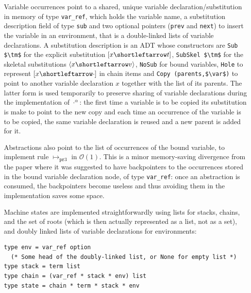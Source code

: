 \documentclass[10pt,a4paper]{article}
\theoremstyle{remark}
\newcommand{\tm}{t}
\newcommand{\var}{x}
\newcommand{\rootRew}[1]{\mapsto_{#1}}
\newcommand{\symfont}[1]{\mathtt{#1}}
\newcommand{\val}{v}
\newcommand{\esub}[2]{[#1{\shortleftarrow}#2]}
\newcommand{\skesub}[2]{\langle#1{\shortleftarrow}#2\rangle}
\newcommand{\renamenop}[1]{#1^\alpha}
\newcommand{\bigo}{{\mathcal{O}}}
\newcommand{\rtomarkblthree}{\rootRew{\prsym3}}
\newcommand{\prsym}{\symfont{pr}}
\begin{document}
Variable occurrences point to a shared, unique variable declaration/substitution in memory of type \lstinline{var_ref}, which holds the variable name, a substitution description field of type \lstinline{sub} and two optional pointers (\lstinline{prev} and \lstinline{next}) to insert the variable in an environment, that is a double-linked lists of variable declarations. A substitution description is an ADT whose constructors are \lstinline{Sub $\tm$} for the explicit substitution $\esub\var\tm$, \lstinline{SubSkel $\tm$} for the skeletal substitutions $\skesub\var\val$, \lstinline{NoSub} for bound variables, \lstinline{Hole} to represent $\esub\var\cdot$ in chain items and \lstinline{Copy (parents,$\var$)} to point to another variable declaration $\var$ together with the list of its parents. The latter form is used temporarily to preserve sharing of variable declarations during the implementation of $\renamenop\cdot$: the first time a variable is to be copied its substitution is make to point to the new copy and each time an occurrence of the variable is to be copied, the same variable declaration is reused and a new parent is added for it.

Abstractions also point to the list of occurrences of the bound variable, to implement rule $\rtomarkblthree$ in $\bigo(1)$. This is a minor memory-saving divergence from the paper where it was suggested to have backpointers to the occurrences stored in the bound variable declaration node, of type \lstinline{var_ref}: once an abstraction is consumed, the backpointers become useless and thus avoiding them in the implementation saves some space.

Machine states are implemented straightforwardly using lists for stacks, chains, and the set of roots (which is then actually represented as a list, not as a set), and doubly linked lists of variable declarations for environments:
\begin{lstlisting}
type env = var_ref option
  (* Some head of the doubly-linked list, or None for empty list *)
type stack = term list                                                                                   
type chain = (var_ref * stack * env) list
type state = chain * term * stack * env
\end{lstlisting}
\end{document}
